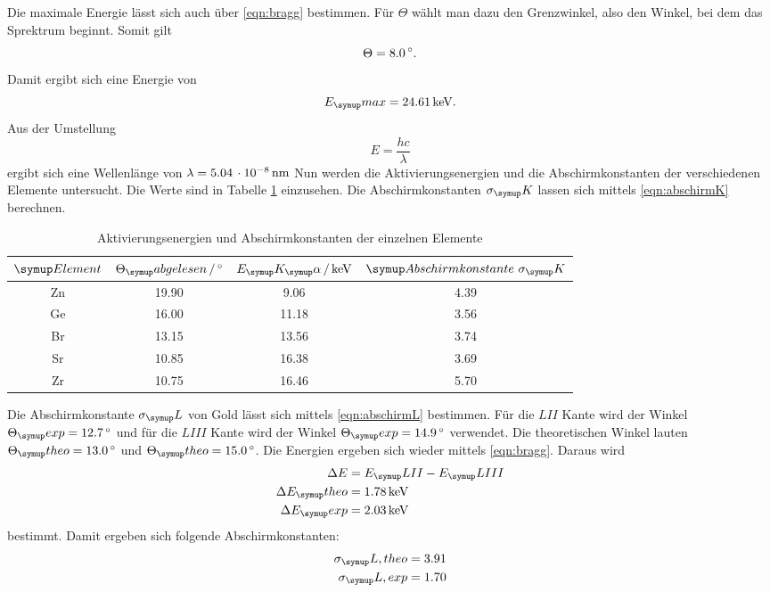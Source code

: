 Die maximale Energie lässt sich auch über \eqref{eqn:bragg} bestimmen. Für $\Theta$
wählt man dazu den Grenzwinkel, also den Winkel, bei dem das Sprektrum beginnt.
Somit gilt
\begin{equation}
  \Theta = 8.0 \,\si{\degree}.
\end{equation}
Damit ergibt sich eine Energie von
\begin{equation}
  E_\su{max} = 24.61 \keV.
\end{equation}
Aus der Umstellung
\begin{equation}
  E = \frac{hc}{\lambda}
\end{equation}
ergibt sich eine Wellenlänge von $\lambda=5.04\,\cdot10^{-8}\,\si{\nano\meter}$
Nun werden die Aktivierungsenergien und die Abschirmkonstanten
der verschiedenen Elemente untersucht. Die
Werte sind in Tabelle \ref{tab:Energie} einzusehen. Die Abschirmkonstanten $\sigma_\su{K}$
lassen sich mittels \eqref{eqn:abschirmK} berechnen.
\begin{table}
  \centering
  \begin{tabular}{c c c c}
    \toprule
    $\su{Element}$ & $\Theta_\su{abgelesen} \,/\dgr$ & $E_\su{K_\su{\alpha}}\,/ \keV$ & $\su{Abschirmkonstante}\,\,\sigma_\su{K}$\\
    \midrule
    Zn & 19.90 &  9.06 & 4.39   \\
    Ge & 16.00 & 11.18 & 3.56   \\
    Br & 13.15 & 13.56 & 3.74   \\
    Sr & 10.85 & 16.38 & 3.69   \\
    Zr & 10.75 & 16.46 & 5.70   \\
    \bottomrule
  \end{tabular}
  \caption{Aktivierungsenergien und Abschirmkonstanten der einzelnen Elemente}
  \label{tab:Energie}
\end{table}
Die Abschirmkonstante $\sigma_\su{L}$
von Gold lässt sich mittels \eqref{eqn:abschirmL} bestimmen.
Für die $LII$ Kante wird der Winkel $\Theta_\su{exp} = 12.7 \dgr$ und für die $LIII$ Kante
wird der Winkel $\Theta_\su{exp} = 14.9 \dgr$ verwendet. Die theoretischen Winkel lauten
$\Theta_\su{theo} = 13.0 \dgr$ und $\Theta_\su{theo} = 15.0 \dgr$.
Die Energien ergeben sich wieder mittels \eqref{eqn:bragg}. Daraus wird
\begin{align*}
  \Delta E &= E_\su{LII} - E_\su{LIII} \\
  \Delta E_\su{theo} &= 1.78 \keV \\
  \Delta E_\su{exp} &= 2.03 \keV \\
\end{align*}
bestimmt.
Damit ergeben sich folgende Abschirmkonstanten:
\begin{align*}
  \sigma_\su{L, theo} &= 3.91  \\
  \sigma_\su{L, exp} &= 1.70 \\
\end{align*}

